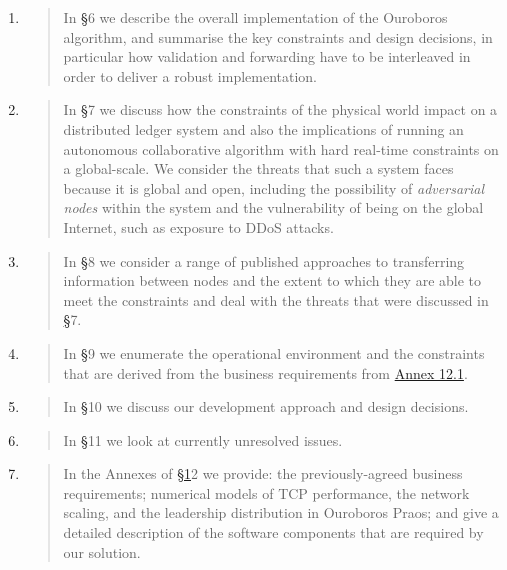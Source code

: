 \documentclass[11pt,a4paper]{article}
\begin{document}
\begin{enumerate}
\def\labelenumi{\arabic{enumi}.}
\item
  \begin{quote}
  In \protect\hyperlink{overview}{{§}}6 we describe the overall
  implementation of the Ouroboros algorithm, and summarise the key
  constraints and design decisions, in particular how validation and
  forwarding have to be interleaved in order to deliver a robust
  implementation.
  \end{quote}
\item
  \begin{quote}
  In \protect\hyperlink{_gr58ztigrqbm}{{§}}7 we discuss how the
  constraints of the physical world impact on a distributed ledger
  system and also the implications of running an autonomous
  collaborative algorithm with hard real-time constraints on a
  global-scale. We consider the threats that such a system faces because
  it is global and open, including the possibility of \emph{adversarial
  nodes} within the system and the vulnerability of being on the global
  Internet, such as exposure to DDoS attacks.
  \end{quote}
\item
  \begin{quote}
  In \protect\hyperlink{_tkmbjtva6lkr}{{§}}8 we consider a range of
  published approaches to transferring information between nodes and the
  extent to which they are able to meet the constraints and deal with
  the threats that were discussed in
  \protect\hyperlink{_gr58ztigrqbm}{{§}}7.
  \end{quote}
\item
  \begin{quote}
  In \protect\hyperlink{_c2gr8venq915}{{§}}9 we enumerate the
  operational environment and the constraints that are derived from the
  business requirements from
  \protect\hyperlink{business-requirements}{{Annex 12.1}}.
  \end{quote}
\item
  \begin{quote}
  In \protect\hyperlink{_ky7e6si1z2eh}{{§}}10 we discuss our development
  approach and design decisions.
  \end{quote}
\item
  \begin{quote}
  In \protect\hyperlink{_7mku7szfvt6w}{{§}}11 we look at currently
  unresolved issues.
  \end{quote}
\item
  \begin{quote}
  In the Annexes of \protect\hyperlink{annexes}{{§1}}2 we provide: the
  previously-agreed business requirements; numerical models of TCP
  performance, the network scaling, and the leadership distribution in
  Ouroboros Praos; and give a detailed description of the software
  components that are required by our solution.
  \end{quote}
\end{enumerate}
\end{document}

